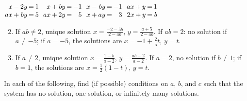 \begin{multicols}{2}
\begin{ex}
\begin{exenumerate}
\exitem 
$\arraycolsep=1pt
\begin{array}[t]{rlrcr}
	x & - & 2y & = & 1 \\
	ax & + & by & = & 5
\end{array}$
\exitem 
$\arraycolsep=1pt
\begin{array}[t]{rlrcr}
	 x & + & by& = & -1 \\
	ax & + & 2y & = & 5
\end{array}$
\exitem 
$\arraycolsep=1pt
\begin{array}[t]{rlrcr}
	x & - & by & = & -1 \\
	x & + & ay & = & 3 
\end{array}$
\exitem
$\arraycolsep=1pt
\begin{array}[t]{rlrcr}
	ax & + & y & = & 1 \\
	2x & + & y & = & b
\end{array}$
\end{exenumerate}

\begin{sol}
\begin{enumerate}[label={\alph*.}]
\setcounter{enumi}{1}
\item  If $ab \neq 2$, unique solution $ x = \frac{-2 - 5b}{2 - ab} $, $y = \frac{a + 5}{2 - ab}$.
 If $ab = 2$: no solution if $a \neq -5$; if $a = -5$, the solutions are $x = -1 + \frac{2}{5} t$, $y = t$.

\setcounter{enumi}{3}
\item  If $a \neq 2$, unique solution $x = \frac{1 - b}{a - 2}$, $y = \frac{ab - 2}{a - 2}$. If $a = 2$, no solution if $b \neq 1$; if $b = 1$, the solutions are $x = \frac{1}{2}(1 - t)$, $y = t$.
\end{enumerate}
\end{sol}
\end{ex}

\begin{ex}
In each of the following, find (if possible) conditions on $a$, $b$, and $c$ such that the system has no solution, one solution, or infinitely many solutions.


\end{ex}
\end{multicols}
